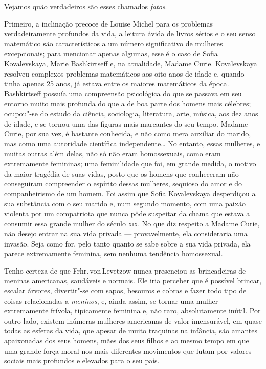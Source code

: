 Vejamos quão verdadeiros são esses chamados \textit{fatos}.

Primeiro, a inclinação precoce de Louise Michel para os problemas
verdadeiramente profundos da vida, a leitura ávida de livros sérios e o
seu senso matemático são característicos a um número significativo de
mulheres excepcionais; para mencionar apenas algumas, esse é o caso de
Sofia Kovalevskaya, Marie Bashkirtseff e, na atualidade, Madame Curie.
Kovalevskaya resolveu complexos problemas matemáticos aos oito anos de
idade e, quando tinha apenas 25 anos, já estava entre os
maiores matemáticos da época. Bashkirtseff possuía uma compreensão
psicológica do que se passava em seu entorno muito mais profunda do que a de
boa parte dos homens mais célebres; ocupou"-se do estudo da ciência,
sociologia, literatura, arte, música, aos dez anos de idade, e se tornou
uma das figuras mais marcantes do seu tempo. Madame Curie, por sua vez,
é bastante conhecida, e não como mera auxiliar do marido, mas como uma
autoridade científica independente\ldots{} No entanto, essas mulheres, e
muitas outras além delas, não só não eram homossexuais, como eram
extremamente femininas; uma feminilidade que foi, em grande medida, o
motivo da maior tragédia de suas vidas, posto que os homens que
conheceram não conseguiram compreender o espírito dessas mulheres,
sequioso do amor e do companheirismo de um homem. Foi assim que Sofia
Kovalevskaya desperdiçou a sua substância com o seu marido e, num
segundo momento, com uma paixão violenta por um compatriota que nunca
pôde suspeitar da chama que estava a consumir essa grande mulher do
século \textsc{xix}. No que diz respeito a Madame Curie, não desejo entrar na sua
vida privada --- provavelmente, ela consideraria uma invasão. Seja como
for, pelo tanto quanto se sabe sobre a sua vida privada, ela parece
extremamente feminina, sem nenhuma tendência homossexual.

Tenho certeza de que Frhr.\,von\,Levetzow nunca presenciou as brincadeiras de meninas americanas, saudáveis e normais. Ele iria perceber que é
possível brincar, escalar árvores, divertir"-se com sapos, besouros e
cobras e fazer todo tipo de coisas relacionadas a \textit{meninos}, e, ainda
assim, se tornar uma mulher extremamente frívola, tipicamente feminina
e, não raro, absolutamente inútil. Por outro lado, existem inúmeras
mulheres americanas de valor imensurável, em quase todas as esferas da
vida, que apesar de muito traquinas na infância, são amantes apaixonadas
dos seus homens, mães dos seus filhos e ao mesmo tempo em que uma grande
força moral nos mais diferentes movimentos que lutam por valores sociais
mais profundos e elevados para o seu país.

